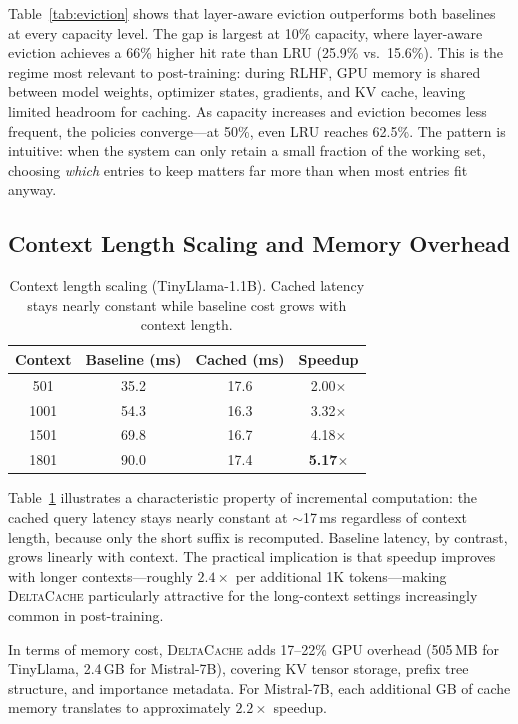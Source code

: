 \documentclass{article}
\newcommand{\deltacache}{\textsc{DeltaCache}}
\begin{document}
Table~\ref{tab:eviction} shows that layer-aware eviction outperforms both baselines at every capacity level. The gap is largest at 10\% capacity, where layer-aware eviction achieves a 66\% higher hit rate than LRU (25.9\% vs.\ 15.6\%). This is the regime most relevant to post-training: during RLHF, GPU memory is shared between model weights, optimizer states, gradients, and KV cache, leaving limited headroom for caching. As capacity increases and eviction becomes less frequent, the policies converge---at 50\%, even LRU reaches 62.5\%. The pattern is intuitive: when the system can only retain a small fraction of the working set, choosing \emph{which} entries to keep matters far more than when most entries fit anyway.

\subsection{Context Length Scaling and Memory Overhead}

\begin{table}[t]
\centering
\caption{Context length scaling (TinyLlama-1.1B). Cached latency stays nearly constant while baseline cost grows with context length.}
\label{tab:scaling}
\small
\begin{tabular}{cccc}
\toprule
Context & Baseline (ms) & Cached (ms) & Speedup \\
\midrule
501 & 35.2 & 17.6 & 2.00$\times$ \\
1001 & 54.3 & 16.3 & 3.32$\times$ \\
1501 & 69.8 & 16.7 & 4.18$\times$ \\
1801 & 90.0 & 17.4 & \textbf{5.17$\times$} \\
\bottomrule
\end{tabular}
\end{table}

Table~\ref{tab:scaling} illustrates a characteristic property of incremental computation: the cached query latency stays nearly constant at ${\sim}$17\,ms regardless of context length, because only the short suffix is recomputed. Baseline latency, by contrast, grows linearly with context. The practical implication is that speedup improves with longer contexts---roughly $2.4\times$ per additional 1K tokens---making \deltacache{} particularly attractive for the long-context settings increasingly common in post-training.

In terms of memory cost, \deltacache{} adds 17--22\% GPU overhead (505\,MB for TinyLlama, 2.4\,GB for Mistral-7B), covering KV tensor storage, prefix tree structure, and importance metadata. For Mistral-7B, each additional GB of cache memory translates to approximately $2.2\times$ speedup.
\end{document}
